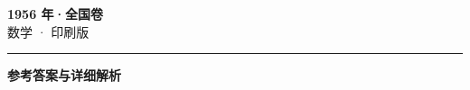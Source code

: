 \documentclass[zihao=5, a4paper]{ctexart}
\begin{document}
\begin{center}
  {\Large\bfseries 1956 年·全国卷}\\[4pt]
  {\large 数学 · 印刷版}
\end{center}
\medskip
{}

\par\bigskip\hrule\bigskip
{}
\begin{center}{\large\bfseries 参考答案与详细解析}\end{center}
\smallskip

\end{document}
